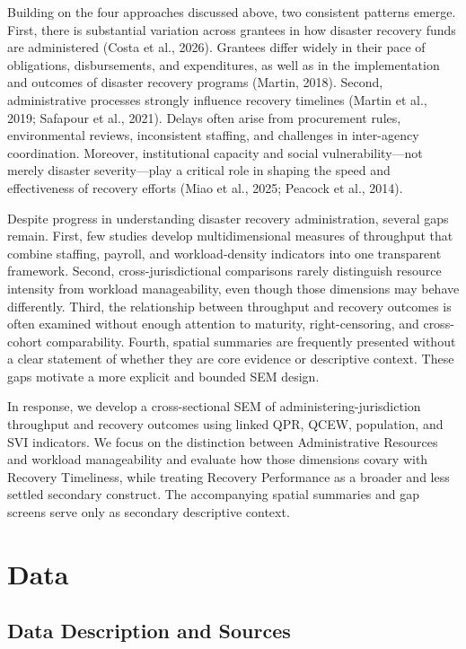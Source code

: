 \documentclass[
  number]{elsarticle}
\begin{document}
Building on the four approaches discussed above, two consistent patterns
emerge. First, there is substantial variation across grantees in how
disaster recovery funds are administered (Costa et al., 2026). Grantees
differ widely in their pace of obligations, disbursements, and
expenditures, as well as in the implementation and outcomes of disaster
recovery programs (Martin, 2018). Second, administrative processes
strongly influence recovery timelines (Martin et al., 2019; Safapour et
al., 2021). Delays often arise from procurement rules, environmental
reviews, inconsistent staffing, and challenges in inter-agency
coordination. Moreover, institutional capacity and social
vulnerability---not merely disaster severity---play a critical role in
shaping the speed and effectiveness of recovery efforts (Miao et al.,
2025; Peacock et al., 2014).

Despite progress in understanding disaster recovery administration,
several gaps remain. First, few studies develop multidimensional
measures of throughput that combine staffing, payroll, and
workload-density indicators into one transparent framework. Second,
cross-jurisdictional comparisons rarely distinguish resource intensity
from workload manageability, even though those dimensions may behave
differently. Third, the relationship between throughput and recovery
outcomes is often examined without enough attention to maturity,
right-censoring, and cross-cohort comparability. Fourth, spatial
summaries are frequently presented without a clear statement of whether
they are core evidence or descriptive context. These gaps motivate a
more explicit and bounded SEM design.

In response, we develop a cross-sectional SEM of
administering-jurisdiction throughput and recovery outcomes using linked
QPR, QCEW, population, and SVI indicators. We focus on the distinction
between Administrative Resources and workload manageability and evaluate
how those dimensions covary with Recovery Timeliness, while treating
Recovery Performance as a broader and less settled secondary construct.
The accompanying spatial summaries and gap screens serve only as
secondary descriptive context.

\section{Data}\label{data}

\subsection{Data Description and
Sources}\label{data-description-and-sources}
\end{document}

